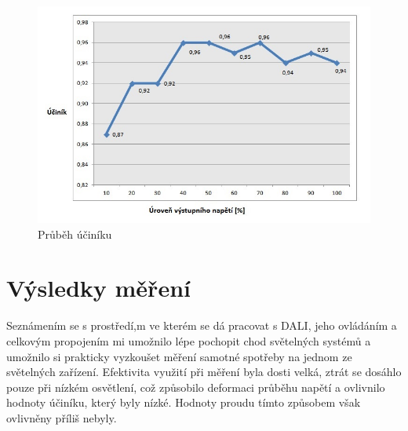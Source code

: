 \documentclass[FM,RP]{tulthesis}
\begin{document}
 
 
     \begin{figure}[h]
     	\begin{center}
     		\hspace*{-15mm}
     		\includegraphics[scale=0.80]{Ucinik.jpg}
     		\caption{Průběh účiníku}
     		\label{Účiník}
     	\end{center}
     \end{figure} 
 
  \section{Výsledky měření}
    Seznámením se s prostředí,m ve kterém se dá pracovat s DALI, jeho ovládáním a celkovým propojením mi umožnilo lépe pochopit chod světelných systémů a umožnilo si prakticky vyzkoušet měření samotné spotřeby na jednom ze světelných zařízení. Efektivita využití při měření byla dosti velká, ztrát se dosáhlo pouze při nízkém osvětlení, což způsobilo deformaci průběhu napětí a ovlivnilo hodnoty účiníku, který byly nízké. Hodnoty proudu tímto způsobem však ovlivněny příliš nebyly. 
     
\end{document}
